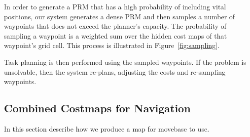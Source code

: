 \documentclass[letterpaper]{article}
\begin{document}
In order to generate a PRM that has a high probability of including vital positions, our system generates a dense PRM and then samples a number of waypoints that does not exceed the planner's capacity. The probability of sampling a waypoint is a weighted sum over the hidden cost maps of that waypoint's grid cell. This process is illustrated in Figure~\ref{fig:sampling}.

Task planning is then performed using the sampled waypoints. If the problem is unsolvable, then the system re-plans, adjusting the costs and re-sampling waypoints.

%
%

\subsection{Combined Costmaps for Navigation}

In this section describe how we produce a map for movebase to use.

% 



\end{document}
